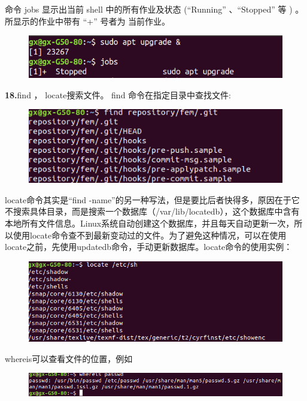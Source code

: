 \documentclass[12pt，a4paper]{article}
\numberwithin{equation}{section}
\begin{document}
命令 jobs 显示出当前 shell 中的所有作业及状态 (“Running” 、“Stopped” 等 ) 。所显示的作业中带有 “+” 号者为 当前作业。
\begin{figure}[H]
\centering
\includegraphics[scale=0.6]{./figures/291.png}
\end{figure}
\textbf{18.}find ， locate搜索文件。 find 命令在指定目录中查找文件:
\begin{figure}[H]
\centering
\includegraphics[scale=0.6]{./figures/267.png}
\end{figure}
locate命令其实是“find -name”的另一种写法，但是要比后者快得多，原因在于它不搜索具体目录，而是搜索一个数据库（/var/lib/locatedb），这个数据库中含有本地所有文件信息。Linux系统自动创建这个数据库，并且每天自动更新一次，所以使用locate命令查不到最新变动过的文件。为了避免这种情况，可以在使用locate之前，先使用updatedb命令，手动更新数据库。locate命令的使用实例：
\begin{figure}[H]
\centering
\includegraphics[scale=0.7]{./figures/292.png}
\end{figure}
whereis可以查看文件的位置，例如
\begin{figure}[H]
\centering
\includegraphics[scale=0.7]{./figures/293.png}
\end{figure}
\end{document}
